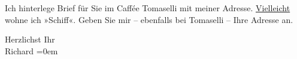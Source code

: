 \pstart
           Ich hinterlege Brief für Sie im Caffée Tomaselli mit meiner Adresse. \uline{Vielleicht}
               wohne ich »Schiff«. Geben Sie mir – ebenfalls
                   bei Tomaselli – Ihre Adresse an.\pend
           
\pstart
           Herzlichst Ihr{\\[\baselineskip]}\spacefill\mbox{Richard}\pend
           \leftskip=0em{}\endnumbering{}  \newcommand{\dateiname}{L01445}\newcommand{\titel}{Richard Beer-Hofmann an Arthur Schnitzler, 15. 9. 1904}\newcommand{\editorInnen}{Martin Anton Müller und Gerd-Hermann Susen}
